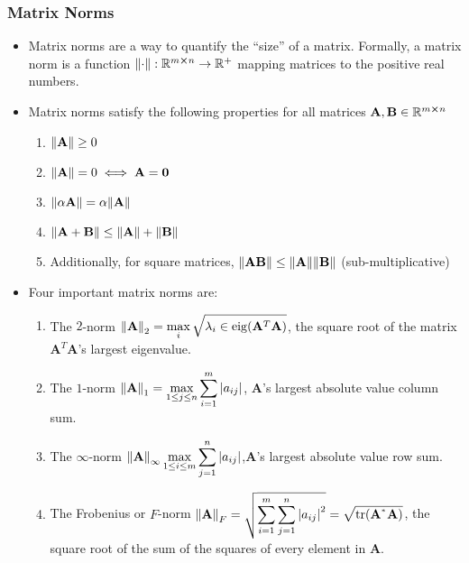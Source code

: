 \documentclass[11pt, a4paper]{article}
\newcommand{\R}{\mathbb{R}} %
\newcommand{\mat}[1]{\mathbf{#1}} %
\begin{document}
\subsubsection{Matrix Norms}
\begin{itemize}
	\item Matrix norms are a way to quantify the ``size'' of a matrix. Formally, a matrix norm is a function $ \norm{\cdot }: \R^{m \cross n} \to \R^{+} $ mapping matrices to the positive real numbers.
	
	\item Matrix norms satisfy the following properties for all matrices $ \mat{A}, \mathbf{B} \in \R^{m \cross n}$
	\begin{enumerate}
		\item $\norm{\mat{A}} \geq 0 \quad $
		\item $ \norm{\mat{A}} = 0 \iff \mat{A} = \bm{0}$
		\item $ \norm{\alpha \mat{A}} = \alpha \norm{\mat{A}}$
		\item $ \norm{\mat{A} + \mathbf{B}} \leq \norm{\mat{A}} + \norm{\mathbf{B}}$ 
		\item Additionally, for square matrices, $ \norm{\mat{A} \mathbf{B}} \leq \norm{\mat{A}} \norm{\mathbf{B}} $ (sub-multiplicative)
	\end{enumerate}
	
	\item  Four important matrix norms are:
	\begin{enumerate}
		\item The $ 2 $-norm $ \displaystyle{\norm{\mat{A}}}_2 =  \max_{i} \sqrt{\lambda_i \in  \operatorname{eig}( \mat{A}^{T}\mat{A} )} $, the square root of the matrix $ \mat{A}^{T}\mat{A} $'s largest eigenvalue.
		
		\item The $ 1 $-norm $ \displaystyle{\norm{\mat{A}}_1 = \max_{1\leq j \leq n} \sum_{i=1}^{m}\abs{a_{ij}}}$, $ \mat{A} $'s largest absolute value column sum.
	
		\item The $ \infty $-norm $ \displaystyle{\norm{\mat{A}}_\infty \max_{1\leq i \leq m} \sum_{j=1}^{n}\abs{a_{ij}}} $,$ \mat{A} $'s largest absolute value row sum.
		
		\item The Frobenius or $ F $-norm $ \displaystyle{\norm{\mat{A}}_F = \sqrt{\sum_{i=1}^{m} \sum_{j=1}^{n} \abs{a_{ij}}^2 } = \sqrt{\tr (\mat{A}^{{}^{*}} \mat{A })}}$, the square root of the sum of the squares of every element in $ \mat{A} $.
	\end{enumerate}
\end{itemize}
\end{document}
